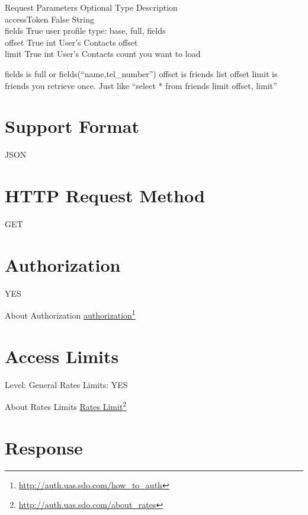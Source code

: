 Request Parameters \textbar{} Optional \textbar{} Type \textbar{} Description\\
accessToken \textbar{} False \textbar{} String\textbar{}\\
fields \textbar{} True \textbar{} user profile type: base, full, fields\\
offset \textbar{} True \textbar{} int \textbar{} User's Contacts offset\\
limit \textbar{} True \textbar{} int \textbar{} User's Contacts count you want to load 

fields is full or fields(``name,tel\_number'')
offset is friends list offset
limit is friends you retrieve once.
Just like ``select * from friends limit offset, limit''

\section{Support Format}
\label{supportformat}

JSON

\section{HTTP Request Method}
\label{httprequestmethod}

GET

\section{Authorization}
\label{authorization}

YES

About Authorization \href{http://auth.uas.sdo.com/how_to_auth}{authorization}\footnote{\href{http://auth.uas.sdo.com/how_to_auth}{http:/\slash auth.uas.sdo.com\slash how\_to\_auth}}

\section{Access Limits}
\label{accesslimits}

Level: General
Rates Limits: YES

About Rates Limits \href{http://auth.uas.sdo.com/about_rates}{Rates Limit}\footnote{\href{http://auth.uas.sdo.com/about_rates}{http:/\slash auth.uas.sdo.com\slash about\_rates}}

\section{Response}
\label{response}

